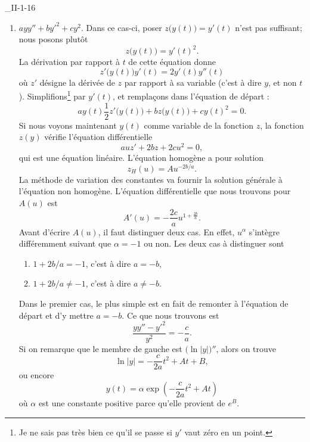 \begin{corrige}{_II-1-16}
\begin{enumerate}
\item
$ayy''+by'^2+cy^2$.
Dans ce cas-ci, poser $z\big( y(t) \big)=y'(t)$ n'est pas suffisant; nous posons plutôt
\begin{equation}
	z\big( y(t) \big)=y'(t)^2.
\end{equation}
La dérivation par rapport à $t$ de cette équation donne
\begin{equation}		\label{EqDerrtChII116}
	z'\big( y(t) \big)y'(t)=2y'(t)y''(t)
\end{equation}
où $z'$ désigne la dérivée de $z$ par rapport à sa variable (c'est à dire $y$, et non $t$). Simplifions\footnote{Je ne sais pas très bien ce qu'il se passe si $y'$ vaut zéro en un point.} par $y'(t)$, et remplaçons dans l'équation de départ :
\begin{equation}
	ay(t)\frac{1 }{2}z'\big( y(t) \big)+bz\big( y(t) \big)+cy(t)^2=0.
\end{equation}
Si nous voyons maintenant $y(t)$ comme variable de la fonction $z$, la fonction $z(y)$ vérifie l'équation différentielle
\begin{equation}
	auz'+2bz+2cu^2=0,
\end{equation}
qui est une équation linéaire. L'équation homogène a pour solution
\begin{equation}
	z_H(u)=Au^{-2b/a}.
\end{equation}
La méthode de variation des constantes va fournir la solution générale à l'équation non homogène. L'équation différentielle que nous trouvons pour $A(u)$ est
\begin{equation}		\label{EqPourAVarCtII116}
	A'(u)=-\frac{ 2c }{ a }u^{1+\frac{ 2b }{ a }}.
\end{equation}
Avant d'écrire $A(u)$, il faut distinguer deux cas. En effet, $u^{\alpha}$ s'intègre différemment suivant que $\alpha=-1$ ou non. Les deux cas à distinguer sont
\begin{enumerate}
\item $1+2b/a=-1$, c'est à dire $a=-b$,
\item $1+2b/a\neq -1$, c'est à dire $a\neq -b$.
\end{enumerate}
Dans le premier cas, le plus simple est en fait de remonter à l'équation de départ et d'y mettre $a=-b$. Ce que nous trouvons est
\begin{equation}
	\frac{ yy''-y'^2 }{ y^2 }=-\frac{ c }{ a }.
\end{equation}
Si on remarque que le membre de gauche est $\big( \ln| y | \big)''$, alors on trouve
\begin{equation}
	\ln| y |=-\frac{ c }{ 2a }t^2+At+B,
\end{equation}
ou encore
\begin{equation}
	y(t)=\alpha  \exp\left( -\frac{ c }{ 2a }t^2+At \right)
\end{equation}
où $\alpha$ est une constante positive parce qu'elle provient de $ e^{B}$.


\end{enumerate}
\end{corrige}
